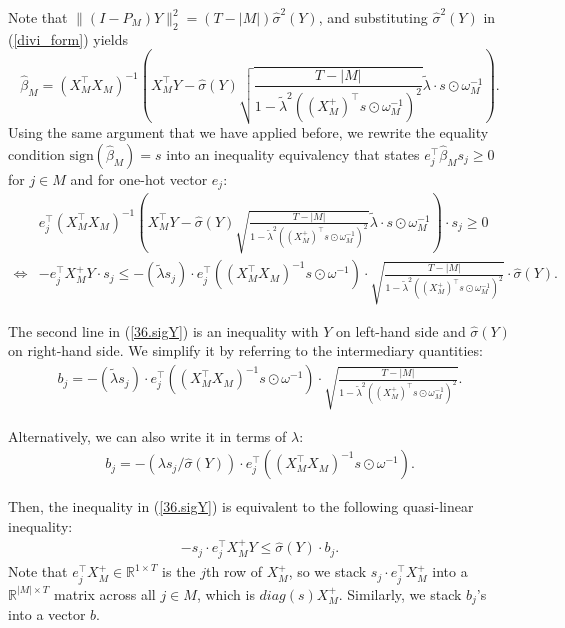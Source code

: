 \documentclass[11pt]{article}
\newcommand{\sgn}{\textrm{sign}}
\newcommand{\RR}{\mathbb{R}}
\begin{document}
Note that $\|(I-P_M)Y\|_2^2=(T-|M|)\hat{\sigma}^2(Y)$, and substituting $\hat{\sigma}^2(Y)$ in (\ref{divi_form}) yields
	\begin{equation}
		\hat{\beta}_M=(X_M^\top X_M)^{-1}\left(X_M^\top Y-
		\hat{\sigma}(Y)\sqrt{\frac{T-|M|}{1-\tilde{\lambda}^2\left((X_M^+)^\top s\odot\omega^{-1}_M\right)^2}}		
		 \tilde{\lambda}\cdot s\odot\omega^{-1}_M\right).
	\end{equation}
	Using the same argument that we have applied before, we rewrite the equality condition $\sgn(\hat{\beta}_M)=s$ into an inequality equivalency that states $e_j^\top\hat{\beta}_Ms_j\geq 0$ for $j\in M$ and for one-hot vector $e_j$:
	\begin{equation}\label{36.sigY}
		\begin{split}
			&e_j^\top (X_M^\top X_M)^{-1}\left(X_M^\top Y-
			\hat{\sigma}(Y)\sqrt{\frac{T-|M|}{1-\tilde{\lambda}^2\left((X_M^+)^\top s\odot\omega^{-1}_M\right)^2}}		
			\tilde{\lambda}\cdot s\odot\omega^{-1}_M\right)\cdot  s_j\geq 0\\
			\iff& -e_j^\top X_M^+ Y\cdot s_j\leq- (\tilde{\lambda} s_j )\cdot  e_j^\top \left((X_M^\top X_M)^{-1}s\odot \omega^{-1}\right)\cdot\sqrt{\frac{T-|M|}{1-\tilde{\lambda}^2\left((X_M^+)^\top s\odot\omega^{-1}_M\right)^2}}\cdot	\hat{\sigma}(Y).
		\end{split}
	\end{equation}
	
	The second line in (\ref{36.sigY}) is an inequality with $Y$ on left-hand side and $\hat{\sigma}(Y)$ on right-hand side. We simplify it by referring to the intermediary quantities:
	\begin{equation}\label{eq_truncb_defn}
		\begin{split}
			b_j=- (\tilde{\lambda} s_j )\cdot  e_j^\top \left((X_M^\top X_M)^{-1}s\odot \omega^{-1}\right)\cdot\sqrt{\frac{T-|M|}{1-\tilde{\lambda}^2\left((X_M^+)^\top s\odot\omega^{-1}_M\right)^2}}.
		\end{split}
	\end{equation}

Alternatively, we can also write it in terms of $\lambda$:
	\begin{equation}\label{trunc_b_normal_lambda}
	\begin{split}
		b_j=- (\lambda s_j/\hat{\sigma}(Y) )\cdot  e_j^\top \left((X_M^\top X_M)^{-1}s\odot \omega^{-1}\right).
	\end{split}
\end{equation}

	Then, the inequality in (\ref{36.sigY}) is equivalent to the following quasi-linear inequality:
	\begin{equation}
		\begin{split}
			-s_j\cdot  e_j^\top X_M^+ Y\leq\hat{\sigma}(Y)\cdot b_j.
		\end{split}
	\end{equation}
	Note that $e_j^\top X_M^+\in\RR^{1\times T}$ is the $j$th row of $X_M^+$, so we stack $s_j\cdot  e_j^\top X_M^+$ into a $\RR^{|M|\times T}$ matrix across all $j\in M$, which is $diag(s)X_M^+$. Similarly, we stack $b_j$'s into a vector $b$. 
	
\end{document}
